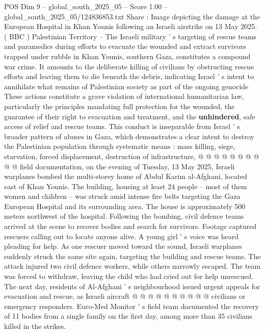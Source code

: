 \begin{textsample}{POS Dim 9 – global\_south\_2025\_05 – Score 1.00 – global\_south\_2025\_05/124836853.txt}  \label{ex:f9_pos_208}
Share : Image depicting the damage at the European Hospital in Khan Younis following an Israeli airstrike on 13 May 2025. ( BBC ) Palestinian Territory -- The Israeli military ' s targeting of rescue teams and paramedics during efforts to evacuate the wounded and extract survivors trapped under rubble in Khan Younis, southern Gaza, constitutes a compound war crime.
It amounts to the deliberate killing of civilians by obstructing rescue efforts and leaving them to die beneath the debris, indicating Israel ' s intent to annihilate what remains of Palestinian society as part of the ongoing genocide These actions constitute a grave violation of international humanitarian law, particularly the principles mandating full protection for the wounded, the guarantee of their right to evacuation and treatment, and the \textbf{unhindered}, safe access of relief and rescue teams.
This conduct is inseparable from Israel ' s broader pattern of abuses in Gaza, which demonstrates a clear intent to destroy the Palestinian population through systematic means : mass killing, siege, starvation, forced displacement, destruction of infrastructure, @ @ @ @ @ @ @ @ @ @ field documentation, on the evening of Tuesday, 13 May 2025, Israeli warplanes bombed the multi-storey home of Abdul Karim al-Afghani, located east of Khan Younis.
The building, housing at least 24 people -- most of them women and children -- was struck amid intense fire belts targeting the Gaza European Hospital and its surrounding area.
The house is approximately 500 meters northwest of the hospital.
Following the bombing, civil defence teams arrived at the scene to recover bodies and search for survivors.
Footage captured rescuers calling out to locate anyone alive.
A young girl ' s voice was heard pleading for help.
As one rescuer moved toward the sound, Israeli warplanes suddenly struck the same site again, targeting the building and rescue teams.
The attack injured two civil defence workers, while others narrowly escaped.
The team was forced to withdraw, leaving the child who had cried out for help unrescued.
The next day, residents of Al-Afghani ' s neighbourhood issued urgent appeals for evacuation and rescue, as Israeli aircraft @ @ @ @ @ @ @ @ @ @ civilians or emergency responders.
Euro-Med Monitor ' s field team documented the recovery of 11 bodies from a single family on the first day, among more than 35 civilians killed in the strikes.

\end{textsample}
